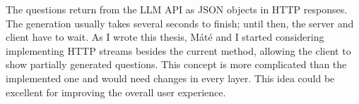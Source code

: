 The questions return from the LLM API as JSON objects in HTTP responses. The generation usually takes several seconds to finish; until then, the server and client have to wait. As I wrote this thesis, Máté and I started considering implementing HTTP streams besides the current method, allowing the client to show partially generated questions. This concept is more complicated than the implemented one and would need changes in every layer. This idea could be excellent for improving the overall user experience.